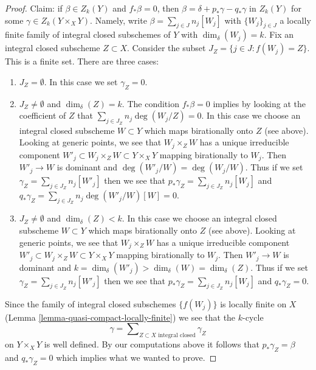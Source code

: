 \begin{proof}
\medskip\noindent
Claim: if $\beta \in Z_k(Y)$ and $f_*\beta = 0$, then
$\beta = \delta + p_*\gamma - q_*\gamma$ in $Z_k(Y)$ for some
$\gamma \in Z_k(Y \times_X Y)$. Namely, write $\beta = \sum_{j \in J} n_j[W_j]$
with $\{W_j\}_{j \in J}$ a locally finite family of integral closed
subschemes of $Y$ with $\dim_\delta(W_j) = k$.
Fix an integral closed subscheme $Z \subset X$. Consider the subset
$J_Z = \{j \in J : f(W_j) = Z\}$. This is a finite set. There are three
cases:
\begin{enumerate}
\item $J_Z = \emptyset$. In this case we set $\gamma_Z = 0$.
\item $J_Z \not = \emptyset$ and $\dim_\delta(Z) = k$.
The condition $f_*\beta = 0$ implies by looking at the
coefficient of $Z$ that $\sum_{j \in J_Z} n_j\deg(W_j/Z) = 0$.
In this case we choose an integral closed subscheme $W \subset Y$
which maps birationally onto $Z$ (see above). Looking at generic
points, we see that $W_j \times_Z W$ has a unique irreducible
component $W'_j \subset W_j \times_Z W \subset Y \times_X Y$
mapping birationally to $W_j$. Then $W'_j \to W$ is dominant
and $\deg(W'_j/W) = \deg(W_j/W)$. Thus if we set
$\gamma_Z = \sum_{j \in J_Z} n_j[W'_j]$
then we see that
$p_*\gamma_Z = \sum_{j \in J_Z} n_j[W_j]$ and
$q_*\gamma_Z = \sum_{j \in J_Z} n_j\deg(W'_j/W)[W] = 0$.
\item $J_Z \not = \emptyset$ and $\dim_\delta(Z) < k$.
In this case we choose an integral closed subscheme $W \subset Y$
which maps birationally onto $Z$ (see above). Looking at generic
points, we see that $W_j \times_Z W$ has a unique irreducible
component $W'_j \subset W_j \times_Z W \subset Y \times_X Y$
mapping birationally to $W_j$. Then $W'_j \to W$ is dominant
and $k = \dim_\delta(W'_j) > \dim_\delta(W) = \dim_\delta(Z)$.
Thus if we set $\gamma_Z = \sum_{j \in J_Z} n_j[W'_j]$
then we see that
$p_*\gamma_Z = \sum_{j \in J_Z} n_j[W_j]$ and
$q_*\gamma_Z = 0$.
\end{enumerate}
Since the family of integral closed subschemes $\{f(W_j)\}$
is locally finite on $X$
(Lemma \ref{lemma-quasi-compact-locally-finite})
we see that the $k$-cycle
$$
\gamma = \sum\nolimits_{Z \subset X\text{ integral closed}} \gamma_Z
$$
on $Y \times_X Y$ is well defined. By our computations above it follows that
$p_*\gamma_Z = \beta$ and $q_*\gamma_Z = 0$ which implies
what we wanted to prove.
\end{proof}













